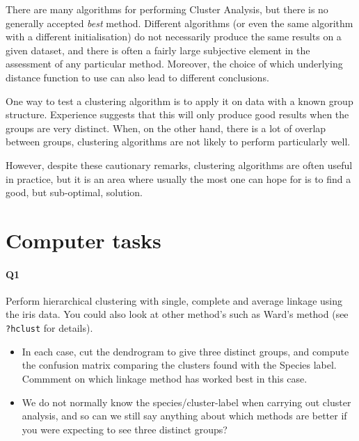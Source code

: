 \documentclass[
]{book}
\providecommand{\tightlist}{%
  \setlength{\itemsep}{0pt}\setlength{\parskip}{0pt}}
\theoremstyle{definition}
\theoremstyle{definition}
\theoremstyle{definition}
\theoremstyle{definition}
\theoremstyle{remark}
\begin{document}
There are many algorithms for performing Cluster Analysis, but there is no generally accepted \emph{best} method. Different algorithms (or even the same algorithm with a different initialisation) do not necessarily produce the same results on a given dataset, and there is often a fairly large subjective element in the assessment of any particular method. Moreover, the choice of which underlying distance function to use can also lead to different conclusions.

One way to test a clustering algorithm is to apply it on data with a known group structure. Experience suggests that this will only produce good results when the groups are very distinct. When, on the other hand, there is a lot of overlap between groups, clustering algorithms are not likely to perform particularly well.

However, despite these cautionary remarks, clustering algorithms are often useful in practice, but it is an area where usually the most one can hope for is to find a good, but sub-optimal, solution.

\section{Computer tasks}\label{computer-tasks-5}

\paragraph*{Q1}\label{q1}

Perform hierarchical clustering with single, complete and average linkage using the iris data. You could also look
at other method's such as Ward's method (see \texttt{?hclust} for details).

\begin{itemize}
\tightlist
\item
  In each case, cut the dendrogram to give three distinct groups, and compute the confusion matrix comparing the clusters found with the Species label.
  Commment on which linkage method has worked best in this case.
\end{itemize}

\begin{itemize}
\tightlist
\item
  We do not normally know the species/cluster-label when carrying out cluster analysis, and so can we still say anything about which methods are better if you were expecting to see three distinct groups?
\end{itemize}
\end{document}
